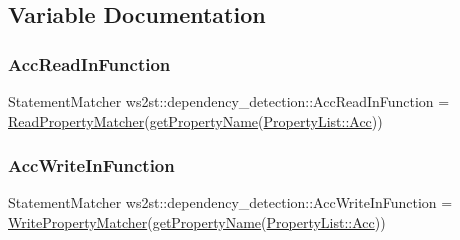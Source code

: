 \subsection{Variable Documentation}
\mbox{\label{namespacews2st_1_1dependency__detection_a5f0f79f9e76ed7202ab5feaafe5217d5}} 
\subsubsection{\texorpdfstring{Acc\+Read\+In\+Function}{AccReadInFunction}}
{\footnotesize\ttfamily Statement\+Matcher ws2st\+::dependency\+\_\+detection\+::\+Acc\+Read\+In\+Function = \mbox{\hyperlink{namespacews2st_1_1dependency__detection_aa8821ec3e79b7058ff4ac29b7b5a8374}{Read\+Property\+Matcher}}(\mbox{\hyperlink{namespacews2st_1_1dependency__detection_aa7715a6e777bd59ab78718644a58b1fa}{get\+Property\+Name}}(\mbox{\hyperlink{namespacews2st_1_1dependency__detection_abcddd986f080a9e5c494edfad3c3faf7a2e02ea7283618d93898c1342e8361dfa}{Property\+List\+::\+Acc}}))}

\mbox{\label{namespacews2st_1_1dependency__detection_a8481caef43197e143ad78cc3f8116ceb}} 
\subsubsection{\texorpdfstring{Acc\+Write\+In\+Function}{AccWriteInFunction}}
{\footnotesize\ttfamily Statement\+Matcher ws2st\+::dependency\+\_\+detection\+::\+Acc\+Write\+In\+Function = \mbox{\hyperlink{namespacews2st_1_1dependency__detection_a0d8350273a214bbd4586dedadf37ab83}{Write\+Property\+Matcher}}(\mbox{\hyperlink{namespacews2st_1_1dependency__detection_aa7715a6e777bd59ab78718644a58b1fa}{get\+Property\+Name}}(\mbox{\hyperlink{namespacews2st_1_1dependency__detection_abcddd986f080a9e5c494edfad3c3faf7a2e02ea7283618d93898c1342e8361dfa}{Property\+List\+::\+Acc}}))}

